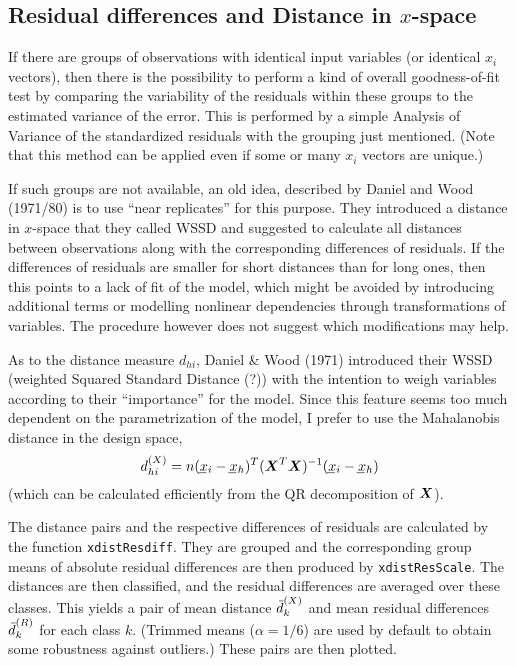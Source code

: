 \documentclass{article}
\providecommand{\vc}[1]{\kern-1pt\underline{\kern1pt#1\kern-1pt}\kern1pt}
\providecommand{\bmath}[1]{\relax\ifmmode{\mbox{\boldmath $#1$}}%
  \else{\boldmath $#1$}\fi}
\providecommand{\mx}[1]{\bmath#1}
\providecommand{\sups}[1]{^{(#1)}}
\providecommand{\wb}[1]{{}\if Y#1\overline{Y}\else
\kern0.2em\overline{\kern-0.2em#1}\fi}
\providecommand{\code}[1]{\texttt{#1}}
\begin{document}
\subsection{Residual differences and Distance in $x$-space}
If there are groups of observations with identical input variables
(or identical $x_i$ vectors), then there is the possibility to perform a kind
of overall goodness-of-fit test by comparing the variability of the
residuals within these groups to the estimated variance of the error.
This is performed by a simple Analysis of Variance of the standardized 
residuals with the grouping just mentioned. 
(Note that this method can be applied even if some or many $x_i$ vectors 
are unique.)

If such groups are not available, an old idea, described by
Daniel and Wood (1971/80) is to use ``near replicates'' for this purpose. 
They introduced a distance in $x$-space that they called WSSD and suggested
to calculate all distances between observations along with the
corresponding differences of residuals. If the differences of residuals
are smaller for short distances than for long ones, then this points to a
lack of fit of the model, which might be avoided by introducing 
additional terms or modelling nonlinear dependencies through
transformations of variables. The procedure however does not suggest
which modifications may help.

As to the distance measure $d_{hi}$, %
Daniel \& Wood (1971) introduced their 
WSSD (weighted Squared Standard Distance (?))
with the intention to weigh variables according to their ``importance'' for
the model. Since this feature seems too much dependent on the
parametrization of the model, I prefer to use the Mahalanobis distance in
the design space, 
$$
  d\sups X_{hi} = n(\vc x_i-\vc x_h)^T (\mx X^T\mx X)^{-1} (\vc x_i-\vc x_h)
$$
(which can be calculated efficiently from the QR decomposition of $\mx X$).

The distance pairs and the respective differences of residuals are
calculated by the function \code{xdistResdiff}. They are grouped and the
corresponding group means of absolute residual differences are then
produced by \code{xdistResScale}. 
The distances are then classified, and the residual differences
are averaged over these classes. This yields a pair of mean distance 
$\wb d\sups X_k$ and mean residual differences $\wb d\sups R_k$ 
for each class $k$. 
(Trimmed means ($\alpha=1/6$) are used by default to obtain some
robustness against outliers.)
These pairs are then plotted.
\end{document}
